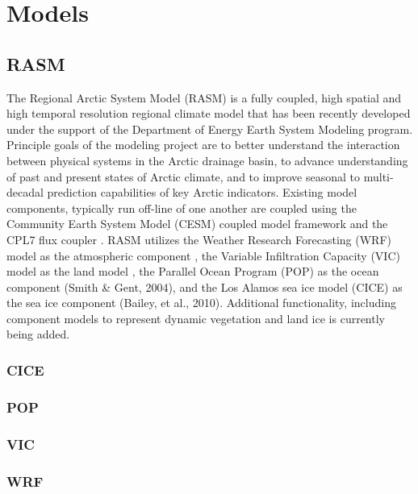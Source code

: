 \section{Models}

\subsection{RASM}

The Regional Arctic System Model (RASM) is a fully coupled, high spatial and high temporal resolution regional climate model that has been recently developed under the support of the Department of Energy Earth System Modeling program.
Principle goals of the modeling project are to better understand the interaction between physical systems in the Arctic drainage basin, to advance understanding of past and present states of Arctic climate, and to improve seasonal to multi-decadal prediction capabilities of key Arctic indicators.
Existing model components, typically run off-line of one another are coupled using the Community Earth System Model (CESM) coupled model framework and the CPL7 flux coupler \cite{Craig_2011}.
RASM utilizes the Weather Research Forecasting (WRF) model as the atmospheric component \cite{Skamarock_2008}, the Variable Infiltration Capacity (VIC) model as the land model \citep[e.g.][Hamman et al. In Review]{Liang_1996}, the Parallel Ocean Program (POP) as the ocean component (Smith \& Gent, 2004), and the Los Alamos sea ice model (CICE) as the sea ice component (Bailey, et al., 2010).
Additional functionality, including component models to represent dynamic vegetation and land ice is currently being added.

\subsubsection{CICE}

\subsubsection{POP}

\subsubsection{VIC}

\subsubsection{WRF}

